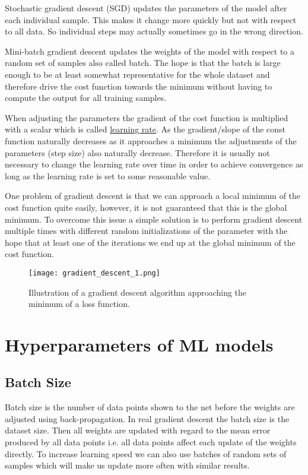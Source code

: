 Stochastic gradient descent (SGD) updates the parameters of the model after each individual sample. This makes it change more quickly but not with respect to all data. So individual steps may actually sometimes go in the wrong direction.

Mini-batch gradient descent updates the weights of the model with respect to a random set of samples also called batch. The hope is that the batch is large enough to be at least somewhat representative for the whole dataset and therefore drive the cost function towards the minimum without having to compute the output for all training samples.

When adjusting the parameters the gradient of the cost function is multiplied with a scalar which is called \hyperref[sec:learning_rate]{learning rate}. As the gradient/slope of the const function naturally decreases as it approaches a minimum the adjustments of the parameters (step size) also naturally decrease. Therefore it is usually not necessary to change the learning rate over time in order to achieve convergence as long as the learning rate is set to some reasonable value.

One problem of gradient descent is that we can approach a local minimum of the cost function quite easily, however, it is not guaranteed that this is the global minimum. To overcome this issue a simple solution is to perform gradient descent multiple times with different random initializations of the parameter with the hope that at least one of the iterations we end up at the global minimum of the cost function.


\begin{figure}[h]
    \centering
    \texttt{[image: gradient\_descent\_1.png]}
    \caption{Illustration of a gradient descent algorithm approaching the minimum of a loss function.}
    \label{fig:gradient_descent}
\end{figure}

\section{Hyperparameters of ML models}

\subsection{Batch Size}

Batch size is the number of data points shown to the net before the weights are adjusted using back-propagation. In real gradient descent the batch size is the dataset size. Then all weights are updated with regard to the mean error produced by all data points i.e. all data points affect each update of the weights directly. To increase learning speed we can also use batches of random sets of samples which will make us update more often with similar results.

